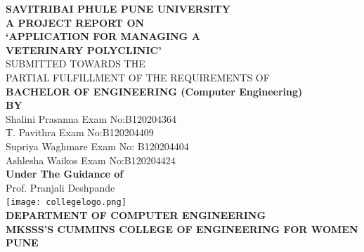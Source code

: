 \documentclass[oneside,a4paper,12pt]{book}
\begin{document}
\setlength{\parindent}{0mm}
\begin{center}
{\bfseries SAVITRIBAI PHULE PUNE UNIVERSITY \\}
 \vspace*{1\baselineskip}
{\bfseries A  PROJECT REPORT ON \\}
 \vspace*{2\baselineskip}
{\bfseries \fontsize{16}{16} \selectfont  `APPLICATION FOR MANAGING A 
\\ VETERINARY POLYCLINIC' \\
\vspace*{4\baselineskip}} 
{\fontsize{12}{12} \selectfont SUBMITTED TOWARDS THE
 \\PARTIAL FULFILLMENT OF THE REQUIREMENTS OF \\

\vspace*{2\baselineskip}}
{\bfseries \fontsize{14}{12} \selectfont BACHELOR OF ENGINEERING (Computer
Engineering) \\
\vspace*{1\baselineskip}} 
{\bfseries \fontsize{14}{12} \selectfont BY \\ 
\vspace*{2\baselineskip}} 
Shalini Prasanna  \hspace{24 mm} Exam No:B120204364  \\
T. Pavithra \hspace{34 mm} Exam No:B120204409  \\
Supriya Waghmare \hspace{23 mm} Exam No: B120204404  \\
Ashlesha Waikos \hspace{25 mm} Exam No:B120204424\\
\vspace*{2\baselineskip}
{\bfseries \fontsize{14}{12} \selectfont Under The Guidance of \\  
\vspace*{2\baselineskip}} 
Prof. Pranjali Deshpande\\
\vspace*{3\baselineskip}
\texttt{[image: collegelogo.png]} \\
\vspace*{3\baselineskip}
{\bfseries \fontsize{14}{12} \selectfont DEPARTMENT OF COMPUTER ENGINEERING \\ 
\vspace*{2\baselineskip}
MKSSS'S CUMMINS COLLEGE OF ENGINEERING FOR WOMEN \\
PUNE
}
\end{center}
\end{document}
